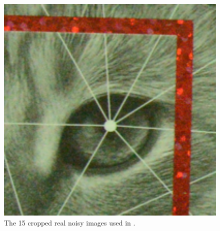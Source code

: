 \documentclass[10pt,twocolumn,letterpaper,sort&compress]{article}
\begin{document}
\begin{figure}
{\begin{minipage}{0.085\textwidth}
\end{minipage}
\begin{minipage}{0.085\textwidth}
\includegraphics[width=1\textwidth]{CC15images/resize_d800_iso6400_3_real.png}
\end{minipage}
}\vspace{-1mm}
\caption{The 15 cropped real noisy images used in \cite{crosschannel2016}.}
\label{fig3}
\vspace{-2mm}
\end{figure}
\end{document}
